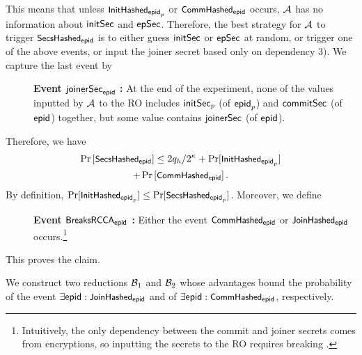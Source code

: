 This means that unless $\initHash_{\hgnodeid_p}$ or $\commitHash_{\hgnodeid}$ occurs, $\Adv$ has no information about $\initSecret$ and $\epochSecret$. Therefore, the best strategy for $\Adv$ to trigger $\secsHash_\hgnodeid$ is to either guess $\initSecret$ or $\epochSecret$ at random, or trigger one of the above events, or input the joiner secret based only on dependency 3). We capture the last event by
\begin{description}
  \item[] {\bf Event $\joinerSecret_{\hgnodeid}$ : } At the end of the experiment, none of the values inputted by $\Adv$ to the RO includes $\initSecret_p$ (of $\hgnodeid_p$) and $\commitSecret$ (of $\hgnodeid$) together, but some value contains $\joinerSecret$ (of $\hgnodeid$).
\end{description}

Therefore, we have
\begin{multline*}
  \Pr\left[\secsHash_\hgnodeid\right] \leq 2q_h/2^\kappa + \Pr[\initHash_{\hgnodeid_p}] \\ + \Pr\left[\commitHash_{\hgnodeid}\right].
\end{multline*}
By definition, $\Pr[\initHash_{\hgnodeid_p}] \leq \Pr[\secsHash_{\hgnodeid_p}]$. Moreover, we define
\begin{description}
  \item[] {\bf Event $\breaksRcca_\hgnodeid$ : } Either the event $\commitHash_{\hgnodeid}$ or $\joinerHash_{\hgnodeid}$ occurs.\footnote{Intuitively,
    the only dependency between the commit and joiner secrets comes from encryptions, so inputting the secrets to the RO requires breaking \indrcca.}
\end{description}
This proves the claim.

We construct two reductions $\Bdv[1]$ and $\Bdv[2]$ whose advantages bound the probability of the event $\exists \hgnodeid : \joinerHash_{\hgnodeid}$ and of $\exists \hgnodeid : \commitHash_{\hgnodeid}$, respectively.


